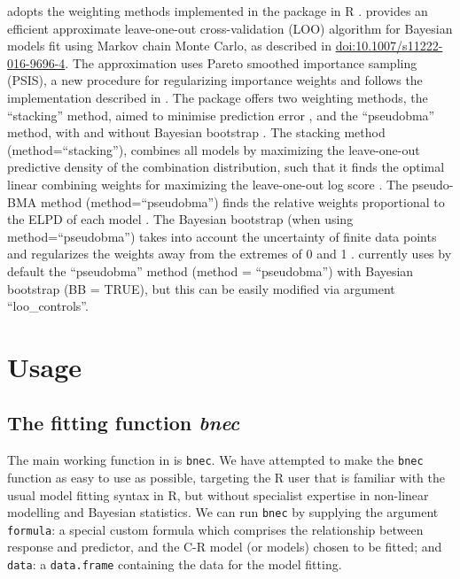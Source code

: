 \documentclass[
  shortnames]{jss}
\begin{document}
 adopts the weighting methods implemented in the  package in R \citep{vehtari2020}.  provides an efficient approximate leave-one-out cross-validation (LOO) algorithm for Bayesian models fit using Markov chain Monte Carlo, as described in \citep{vehtari2017} \url{doi:10.1007/s11222-016-9696-4}. The approximation uses Pareto smoothed importance sampling (PSIS), a new procedure for regularizing importance weights and follows the implementation described in \citep{Vehtari2019}. The  package offers two weighting methods, the ``stacking'' method, aimed to minimise prediction error \citep{Yao2018}, and the ``pseudobma'' method, with and without Bayesian bootstrap \citep{vehtari2020, vehtari2017}. The stacking method (method=``stacking''), combines all models by maximizing the leave-one-out predictive density of the combination distribution, such that it finds the optimal linear combining weights for maximizing the leave-one-out log score \citep{vehtari2020}. The pseudo-BMA method (method=``pseudobma'') finds the relative weights proportional to the ELPD of each model \citep{vehtari2020}. The Bayesian bootstrap (when using method=``pseudobma'') takes into account the uncertainty of finite data points and regularizes the weights away from the extremes of 0 and 1 \citep{vehtari2020}.  currently uses by default the ``pseudobma'' method (method = ``pseudobma'') with Bayesian bootstrap (BB = TRUE), but this can be easily modified via argument ``loo\_controls''.

\hypertarget{usage}{%
\section{Usage}\label{usage}}

\subsection[The fitting function bnec]{The fitting function \emph{bnec}}\label{ffbnec}

The main working function in  is \texttt{bnec}. We have attempted to make the \texttt{bnec} function as easy to use as possible, targeting the R user that is familiar with the usual model fitting syntax in R, but without specialist expertise in non-linear modelling and Bayesian statistics. We can run \texttt{bnec} by supplying the argument \texttt{formula}: a special custom formula which comprises the relationship between response and predictor, and the C-R model (or models) chosen to be fitted; and \texttt{data}: a \texttt{data.frame} containing the data for the model fitting.
\end{document}
